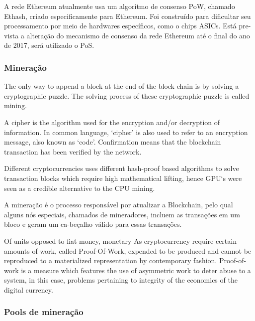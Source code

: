 \documentclass[
	article,			%
	12pt,				%
	openright,			%
	oneside,			%
	a4paper,			%
	chapter=TITLE,		%
	section=TITLE,		%
	subsection=TITLE,	%
	subsubsection=TITLE,%
	subsubsubsection=TITLE, %
	english,			%
	brazil,				%
	]{abntex2}
\begin{document}
A rede Ethereum atualmente usa um algoritmo de consenso PoW, chamado Ethash, criado especificamente para Ethereum. Foi construído para dificultar seu processamento por meio de hardwares específicos, como o chips ASICs. Está pre-vista a alteração do mecanismo de consenso da rede Ethereum até o final do ano de 2017, será utilizado o PoS.

\cite{Dlamini2017}

\subsubsection{Mineração}

The only way to append a block at the end of the block chain is by solving a cryptographic puzzle. The solving process of these cryptographic puzzle is called
mining.

\cite{Weber2012}

A cipher is the algorithm used for the encryption and/or decryption of information. In common language, ‘cipher’ is also used to refer to an encryption message, also known as ‘code’. Confirmation means that the blockchain transaction has been verified by the network.

\cite{Arsov}

Different cryptocurrencies uses different hash-proof based algorithms to solve transaction blocks which require high mathematical lifting, hence GPU‘s were seen as a credible alternative to the CPU mining.

\cite{Krishnan2015}

A mineração é o processo responsável por atualizar a Blockchain, pelo qual alguns nós especiais, chamados de mineradores, incluem as transações em um bloco e geram um ca-beçalho válido para essas transações.

\cite{LChicarino}


Of units opposed to fiat money, monetary As cryptocurrency require
certain amounts of work, called Proof-Of-Work, expended to be produced
and cannot be reproduced to a materialized representation by
contemporary fashion. Proof-of-work is a measure which features the
use of asymmetric work to deter abuse to a system, in this case,
problems pertaining to integrity of the economics of the digital
currency.

\cite{Dev2014}

\subsubsection{Pools de mineração}
\end{document}
